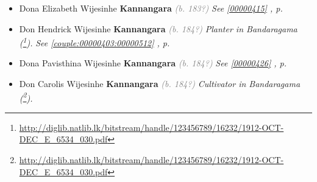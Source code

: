 \documentclass[10pt, openany]{book}
\begin{document}
\begin{itemize}
{\begin{itemize}
{\begin{itemize}
{\begin{itemize}
{\begin{itemize}
{\begin{itemize}
{  }
\item{Dona Hilda Clarice \textbf{Karagala} \textcolor{gray}{\textit{(b. 191?)}}
   }
\end{itemize}}
\end{itemize}
  }
\item{Alan Wijesinghe \textbf{Kannangara} \textcolor{gray}{\textit{(b. 188?)}}
  }
\item{Clara Wijesinghe \textbf{Kannangara} \textcolor{gray}{\textit{(b. 188?)}}
  }
\item{Victor Wijesinghe \textbf{Kannangara} \textcolor{gray}{\textit{(b. 189?)}}
  }
\item{Hinton Albert Wijesinghe \textbf{Kannangara} \textcolor{gray}{\textit{(b. 189?)}}
   }
\item{Cornelis Wijesinghe \textbf{Kannangara} \textcolor{gray}{\textit{(b. 189?)}}
  }
\end{itemize}}
\end{itemize}
   }
\item{Dona Elizabeth Wijesinhe \textbf{Kannangara} \textcolor{gray}{\textit{(b. 183?)}} \textcolor{slteal}{\textit{See  \autoref{00000415} \textit{, p. \pageref{00000415} }}}}
\item{Don Hendrick Wijesinhe  \textbf{Kannangara} \textcolor{gray}{\textit{(b. 184?)}} \textcolor{slmaroon}{\textit{Planter in Bandaragama (\footnote{\url{http://diglib.natlib.lk/bitstream/handle/123456789/16232/1912-OCT-DEC_E_6534_030.pdf}}).}} \textcolor{slteal}{\textit{See  \autoref{couple:00000403:00000512} \textit{, p. \pageref{couple:00000403:00000512} }}}}
\item{Dona Pavisthina Wijesinhe \textbf{Kannangara} \textcolor{gray}{\textit{(b. 184?)}} \textcolor{slteal}{\textit{See  \autoref{00000426} \textit{, p. \pageref{00000426} }}}}
\item{Don Carolis Wijesinhe \textbf{Kannangara} \textcolor{gray}{\textit{(b. 184?)}} \textcolor{slmaroon}{\textit{Cultivator in Bandaragama (\footnote{\url{http://diglib.natlib.lk/bitstream/handle/123456789/16232/1912-OCT-DEC_E_6534_030.pdf}}).}}
}
\end{itemize}}
\end{itemize}
\end{document}
